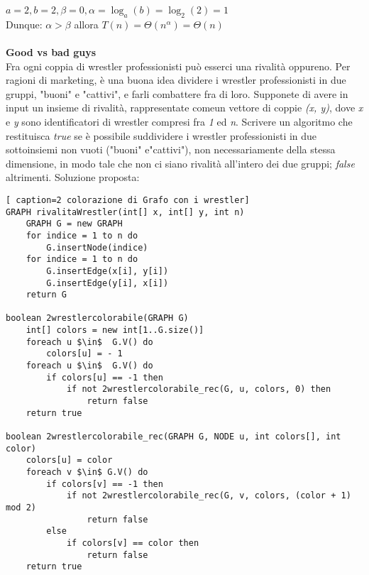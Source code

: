\documentclass[../cheatSheetAlgoritmi.tex]{subfiles}
\begin{document}
$a = 2, b = 2, \beta = 0, \alpha = \log_a(b) = \log_2(2) = 1$\\
Dunque: $\alpha > \beta$ allora $T(n) = \Theta(n^\alpha) = \Theta(n)$ 
\\\\
\textbf{Good vs bad guys}\\
Fra ogni coppia di wrestler professionisti può esserci una rivalità oppureno. Per ragioni di marketing, è una buona idea dividere i wrestler professionisti in due gruppi, "buoni" e "cattivi", e farli combattere fra di loro. Supponete di avere in input un insieme di rivalità, rappresentate comeun vettore di coppie \textit{(x, y)}, dove \textit{x} e \textit{y} sono identificatori di wrestler compresi fra \textit{1} ed \textit{n}. Scrivere un algoritmo che restituisca \textit{true} se è possibile suddividere i wrestler professionisti in due sottoinsiemi non vuoti ("buoni" e"cattivi"), non necessariamente della stessa dimensione, in modo tale che non ci siano rivalità all’intero dei due gruppi; \textit{false} altrimenti.
\newpage
Soluzione proposta:
\begin{lstlisting}[ caption=2 colorazione di Grafo con i wrestler]
GRAPH rivalitaWrestler(int[] x, int[] y, int n)
	GRAPH G = new GRAPH
  	for indice = 1 to n do
    	G.insertNode(indice)
  	for indice = 1 to n do
    	G.insertEdge(x[i], y[i])
    	G.insertEdge(y[i], x[i])
  	return G

boolean 2wrestlercolorabile(GRAPH G)
	int[] colors = new int[1..G.size()]
  	foreach u $\in$  G.V() do
    	colors[u] = - 1
  	foreach u $\in$  G.V() do
    	if colors[u] == -1 then
      		if not 2wrestlercolorabile_rec(G, u, colors, 0) then
        		return false
  	return true

boolean 2wrestlercolorabile_rec(GRAPH G, NODE u, int colors[], int color)
	colors[u] = color
  	foreach v $\in$ G.V() do
    	if colors[v] == -1 then
      		if not 2wrestlercolorabile_rec(G, v, colors, (color + 1) mod 2)
        		return false
    	else
      		if colors[v] == color then
        		return false
  	return true
\end{lstlisting}
\end{document}
